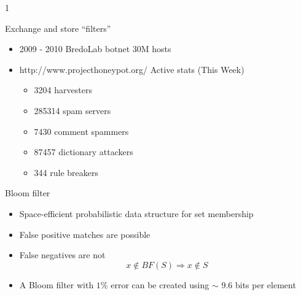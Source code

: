 1\documentclass{beamer}
\begin{document}
\begin{frame}{Exchange and store ``filters''}
  \begin{itemize}
  \item 2009 - 2010 BredoLab botnet 30M hosts
  \item http://www.projecthoneypot.org/ Active stats (This Week)
  \begin{itemize}
      \item 3204 harvesters
      \item 285314 spam servers
      \item 7430 comment spammers
      \item 87457 dictionary attackers
      \item 344 rule breakers
    \end{itemize}
  \end{itemize}
\end{frame}

\begin{frame}{Bloom filter}
  \begin{itemize}
  \item Space-efficient probabilistic data structure for set membership
  \item False positive matches are possible
  \item False negatives are not
    \[
      x \not \in BF(S) \Rightarrow x \not \in S
    \]
  \item  A Bloom filter with $1\%$ error can be created using
    $\sim$ 9.6 bits per element
  \end{itemize}
\end{frame}
\end{document}
